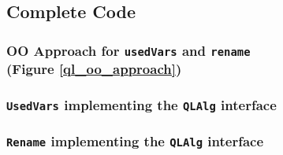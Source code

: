 \clearpage
\subsection{Complete Code}

\subsubsection{OO Approach for \lstinline{usedVars} and \lstinline{rename}\\ (Figure \ref{ql_oo_approach})}


\subsubsection{\lstinline{UsedVars} implementing the \lstinline{QLAlg} interface}


\subsubsection{\lstinline{Rename} implementing the \lstinline{QLAlg} interface}

